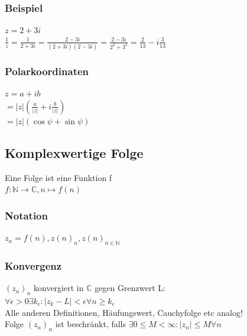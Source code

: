 \documentclass[fleqn]{scrbook}
\begin{document}
\subsubsection{Beispiel} $z = 2 +3i$\\
$\frac{1}{z} = \frac{1}{2+3i} = \frac{2-3i}{(2+3i)(2-3i)} = \frac{2-3i}{2^2 + 3^2} = \frac{2}{13} - i\frac{3}{13}$
\subsubsection{Polarkoordinaten} $z = a + ib$\\
$=|z|(\frac{a}{|z|}+i\frac{b}{|z|})$\\
$=|z|(\cos \psi + \sin \psi)$
\subsection{Komplexwertige Folge} Eine Folge ist eine Funktion f\\
$f:\mathbb{N}\rightarrow \mathbb{C},n\mapsto f(n)$
\subsubsection{Notation} $z_n = f(n),z(n)_n, z(n)_{n\in\mathbb{N}}$
\subsubsection{Konvergenz} $(z_n)_n$ konvergiert in $\mathbb{C}$ gegen Grenzwert L:\\
$\forall\epsilon > 0 \exists k_\epsilon : |z_k - L| < \epsilon \forall n \geq k_\epsilon$\\Alle anderen Definitionen, Häufungswert, Cauchyfolge etc analog!\\
Folge $(z_n)_n$ ist beschränkt, falls $\exists 0 \leq M < \infty:|z_n|\leq M \forall n$
\end{document}
